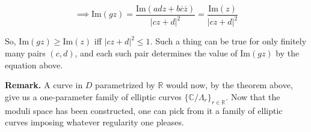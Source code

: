 \documentclass[11pt,a4paper]{article}
\begin{document}
    $$ \implies \text{Im}(gz) = \frac{\text{Im}(adz + b\overline{c}\overline{z})}{|cz+d|^2} = \frac{\text{Im}(z)}{|cz+d|^2}$$

    So, $\text{Im}(gz) \geq \text{Im}(z)$ iff $|cz+d|^2 \leq 1$. Such a thing can be true for only finitely many pairs $(c, d)$, and each such pair determines the value of $\text{Im}(gz)$ by the equation above.



\textbf{Remark.} A curve in $D$ parametrized by $\mathbb{R}$ would now, by the theorem above, give us a one-parameter family of elliptic curves $\{\mathbb{C}/\Lambda_r\}_{r\in \mathbb{R}}$. Now that the moduli space has been constructed, one can pick from it a family of elliptic curves imposing whatever regularity one pleases.
\end{document}

